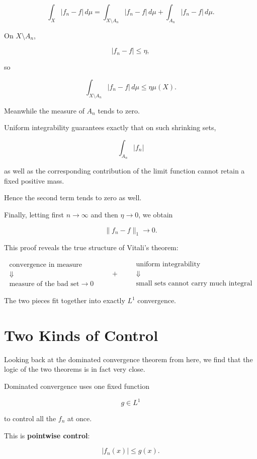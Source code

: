 \documentclass[11pt]{article}
\begin{document}
\[
\int_X|f_n-f|\,d\mu
=
\int_{X\setminus A_n}|f_n-f|\,d\mu
+
\int_{A_n}|f_n-f|\,d\mu.
\]

On $X\setminus A_n$,

\[
|f_n-f|\leq\eta,
\]

so

\[
\int_{X\setminus A_n}|f_n-f|\,d\mu
\leq
\eta\mu(X).
\]

Meanwhile the measure of $A_n$ tends to zero.

Uniform integrability guarantees exactly that on such shrinking sets,

\[
\int_{A_n}|f_n|
\]

as well as the corresponding contribution of the limit function cannot retain a fixed positive mass.

Hence the second term tends to zero as well.

Finally, letting first $n\to\infty$ and then $\eta\to0$, we obtain

\[
\|f_n-f\|_1\to0.
\]

This proof reveals the true structure of Vitali's theorem:

\[
\boxed{
\begin{array}{c}
\text{convergence in measure}\\
\Downarrow\\
\text{measure of the bad set}\to 0
\end{array}
\qquad+\qquad
\begin{array}{c}
\text{uniform integrability}\\
\Downarrow\\
\text{small sets cannot carry much integral}
\end{array}
}
\]

The two pieces fit together into exactly $L^1$ convergence.


\section{Two Kinds of Control}


Looking back at the dominated convergence theorem from here, we find that the logic of the two theorems is in fact very close.

Dominated convergence uses one fixed function

\[
g\in L^1
\]

to control all the $f_n$ at once.

This is \textbf{pointwise control}:

\[
|f_n(x)|\leq g(x).
\]
\end{document}
